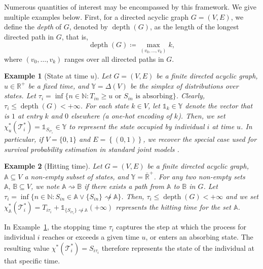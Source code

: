 \documentclass{sn-jnl}
\newtheorem{example}{Example}
\begin{document}
Numerous quantities of interest may be encompassed by this framework. We give multiple examples below. First, for a directed acyclic graph $G = (V, E)$, we define the \emph{depth} of $G$, denoted by $\operatorname{depth}(G)$, as the length of the longest directed path in $G$, that is,
\[
    \operatorname{depth}(G) \coloneqq \max_{(v_0, \dots, v_k)} k,
\]
where $(v_0,\dots, v_k)$ ranges over all directed paths in $G$.

\begin{example}[State at time $u$] \label{ex:state-at-time-u}
    Let $G = (V, E)$ be a finite directed acyclic graph, $u \in \mathbb{R}^+$ be a fixed time, and $\mathbb{Y} = \Delta(V)$ be the simplex of distributions over states. Let $\tau_i = \inf \{ n \in \mathbb{N}: T_{in} \geq u \text{ or } S_{in} \text{ is absorbing} \}$. Clearly, $\tau_i \leq \operatorname{depth}(G) < +\infty$. For each state $k \in V$, let $\mathds{1}_k \in \mathbb{Y}$ denote the vector that is $1$ at entry $k$ and $0$ elsewhere (a one-hot encoding of $k$). Then, we set $\chi_u^*(\mathcal{T}_i^*) = \mathds{1}_{S_{i\tau_i}} \in \mathbb{Y}$ to represent the state occupied by individual $i$ at time $u$. In particular, if $V = \{ 0, 1 \}$ and $E = \left\{ (0, 1) \right\}$, we recover the special case used for survival probability estimation in standard joint models \citep{rizopoulos2011dynamic}.
\end{example}

\bigbreak

\begin{example}[Hitting time] \label{ex:hitting-time}
    Let $G = (V, E)$ be a finite directed acyclic graph, $\mathbb{A} \subseteq V$ a non-empty subset of states, and $\mathbb{Y} = \bar{\mathbb{R}}^+$. For any two non-empty sets $\mathbb{A}, \, \mathbb{B} \subseteq V$, we note $\mathbb{A} \rightsquigarrow \mathbb{B}$ if there exists a path from $\mathbb{A}$ to $\mathbb{B}$ in $G$. Let $\tau_i = \inf \{ n \in \mathbb{N} : S_{in} \in \mathbb{A} \vee \{ S_{in} \} \not \rightsquigarrow \mathbb{A} \}$. Then, $\tau_i \leq \operatorname{depth}(G) < +\infty$ and we set $\chi_{\mathbb{A}}^*(\mathcal{T}_i^*) = T_{i\tau_i} + \mathds{1}_{\{ S_{i\tau_i} \} \not \rightsquigarrow \mathbb{A}} (+\infty)$ represents the hitting time for the set $\mathbb{A}$.
\end{example}

\bigbreak

In Example~\ref{ex:state-at-time-u}, the stopping time $\tau_i$ captures the step at which the process for individual $i$ reaches or exceeds a given time $u$, or enters an absorbing state.
The resulting value $\chi^*(\mathcal{T}_i^*) = S_{i\tau_i}$ therefore represents the state of the individual at that specific time.
\end{document}
